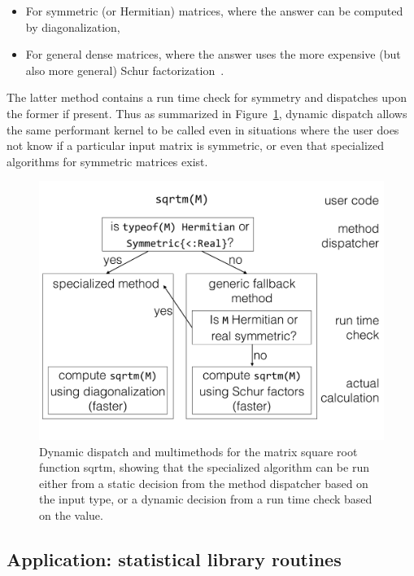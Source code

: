 \documentclass[pldi]{sigplanconf-pldi15}
\begin{document}
\begin{itemize}
	\item For symmetric (or Hermitian) matrices, where the answer can be
		computed by diagonalization,
	\item For general dense matrices, where the answer uses the more
		expensive (but also more general) Schur
		factorization~\cite{Higham2008}.
\end{itemize}
%
The latter method contains a run time check for symmetry and dispatches upon
the former if present. Thus as summarized in Figure~\ref{fig:sqrtm}, dynamic
dispatch allows the same performant kernel to be called even in situations
where the user does not know if a particular input matrix is symmetric, or even
that specialized algorithms for symmetric matrices exist.

\begin{figure}
	\centering
	\includegraphics[width=\columnwidth]{fig-sqrtm}
	\caption{Dynamic dispatch and multimethods for the matrix square root
	function sqrtm, showing that the specialized algorithm can be
	run either from a static decision from the method dispatcher based on
	the input type, or a dynamic decision from a run time check based on
	the value.}
	\label{fig:sqrtm}
\end{figure}


\subsection{Application: statistical library routines}
\end{document}
